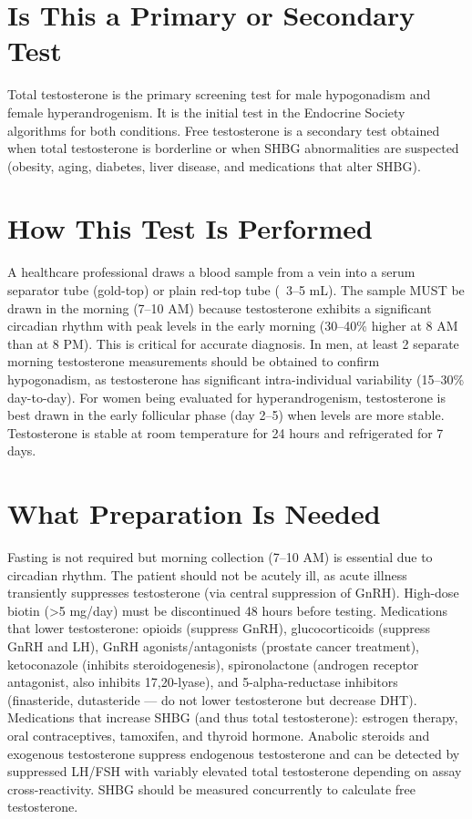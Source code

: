 \section*{Is This a Primary or Secondary Test}
Total testosterone is the primary screening test for male hypogonadism and female hyperandrogenism. It is the initial test in the Endocrine Society algorithms for both conditions. Free testosterone is a secondary test obtained when total testosterone is borderline or when SHBG abnormalities are suspected (obesity, aging, diabetes, liver disease, and medications that alter SHBG).

\section*{How This Test Is Performed}
A healthcare professional draws a blood sample from a vein into a serum separator tube (gold-top) or plain red-top tube (~3--5 mL). The sample MUST be drawn in the morning (7--10 AM) because testosterone exhibits a significant circadian rhythm with peak levels in the early morning (30--40\% higher at 8 AM than at 8 PM). This is critical for accurate diagnosis. In men, at least 2 separate morning testosterone measurements should be obtained to confirm hypogonadism, as testosterone has significant intra-individual variability (15--30\% day-to-day). For women being evaluated for hyperandrogenism, testosterone is best drawn in the early follicular phase (day 2--5) when levels are more stable. Testosterone is stable at room temperature for 24 hours and refrigerated for 7 days.

\section*{What Preparation Is Needed}
Fasting is not required but morning collection (7--10 AM) is essential due to circadian rhythm. The patient should not be acutely ill, as acute illness transiently suppresses testosterone (via central suppression of GnRH). High-dose biotin (>5 mg/day) must be discontinued 48 hours before testing. Medications that lower testosterone: opioids (suppress GnRH), glucocorticoids (suppress GnRH and LH), GnRH agonists/antagonists (prostate cancer treatment), ketoconazole (inhibits steroidogenesis), spironolactone (androgen receptor antagonist, also inhibits 17,20-lyase), and 5-alpha-reductase inhibitors (finasteride, dutasteride --- do not lower testosterone but decrease DHT). Medications that increase SHBG (and thus total testosterone): estrogen therapy, oral contraceptives, tamoxifen, and thyroid hormone. Anabolic steroids and exogenous testosterone suppress endogenous testosterone and can be detected by suppressed LH/FSH with variably elevated total testosterone depending on assay cross-reactivity. SHBG should be measured concurrently to calculate free testosterone.

